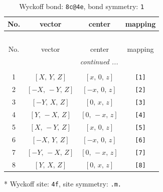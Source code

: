 \documentclass[fleqn,8pt]{jsarticle}
\begin{document}
\renewcommand{\arraystretch}{1.2}
\begin{longtable}{cccc}
\caption{Wyckoff bond: {\tt 8c@4e}, bond symmetry: {\tt 1}}
 \\
 \hline \hline
No. & vector & center & mapping \\ \hline \endfirsthead

\multicolumn{3}{l}{\tablename\ \thetable{}} \\
 \hline \hline
No. & vector & center & mapping \\ \hline \endhead

 \hline \hline
\multicolumn{3}{r}{\footnotesize\it continued ...} \\ \endfoot

 \hline \hline
\multicolumn{3}{r}{} \\ \endlastfoot

1 & $\left[ X,\, Y,\, Z \right]$ & $\left[ x,\, 0,\, z \right]$ & {\tt [1]} \\ \hline
2 & $\left[ - X,\, - Y,\, Z \right]$ & $\left[ - x,\, 0,\, z \right]$ & {\tt [2]} \\ \hline
3 & $\left[ - Y,\, X,\, Z \right]$ & $\left[ 0,\, x,\, z \right]$ & {\tt [3]} \\ \hline
4 & $\left[ Y,\, - X,\, Z \right]$ & $\left[ 0,\, - x,\, z \right]$ & {\tt [4]} \\ \hline
5 & $\left[ X,\, - Y,\, Z \right]$ & $\left[ x,\, 0,\, z \right]$ & {\tt [5]} \\ \hline
6 & $\left[ - X,\, Y,\, Z \right]$ & $\left[ - x,\, 0,\, z \right]$ & {\tt [6]} \\ \hline
7 & $\left[ - Y,\, - X,\, Z \right]$ & $\left[ 0,\, - x,\, z \right]$ & {\tt [7]} \\ \hline
8 & $\left[ Y,\, X,\, Z \right]$ & $\left[ 0,\, x,\, z \right]$ & {\tt [8]} \\
\end{longtable}
* Wyckoff site: {\tt 4f}, site symmetry: {\tt .m.}
\renewcommand{\arraystretch}{1.2}
\end{document}

